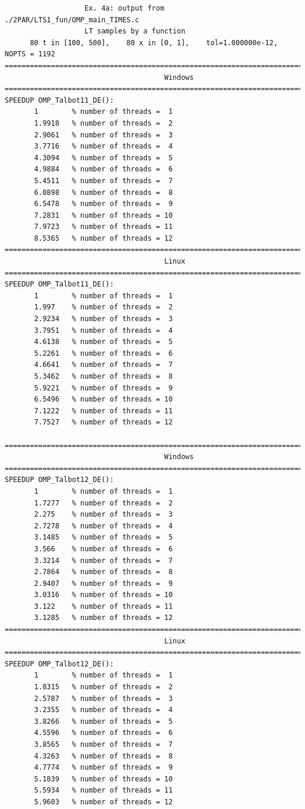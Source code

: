 \documentclass[a4paper,10pt]{report}%
\begin{document}
\begin{lstlisting}
                   Ex. 4a: output from ./2PAR/LTS1_fun/OMP_main_TIMES.c
                   LT samples by a function
      80 t in [100, 500],    80 x in [0, 1],    tol=1.000000e-12,    NOPTS = 1192
====================================================================================
                                      Windows
====================================================================================
SPEEDUP OMP_Talbot11_DE():
       1        % number of threads =  1
       1.9918   % number of threads =  2
       2.9061   % number of threads =  3
       3.7716   % number of threads =  4
       4.3094   % number of threads =  5
       4.9884   % number of threads =  6
       5.4511   % number of threads =  7
       6.0898   % number of threads =  8
       6.5478   % number of threads =  9
       7.2831   % number of threads = 10
       7.9723   % number of threads = 11
       8.5365   % number of threads = 12
====================================================================================
                                      Linux
====================================================================================
SPEEDUP OMP_Talbot11_DE():
       1        % number of threads =  1
       1.997    % number of threads =  2
       2.9234   % number of threads =  3
       3.7951   % number of threads =  4
       4.6138   % number of threads =  5
       5.2261   % number of threads =  6
       4.6641   % number of threads =  7
       5.3462   % number of threads =  8
       5.9221   % number of threads =  9
       6.5496   % number of threads = 10
       7.1222   % number of threads = 11
       7.7527   % number of threads = 12

====================================================================================
                                      Windows
====================================================================================
SPEEDUP OMP_Talbot12_DE():
       1        % number of threads =  1
       1.7277   % number of threads =  2
       2.275    % number of threads =  3
       2.7278   % number of threads =  4
       3.1485   % number of threads =  5
       3.566    % number of threads =  6
       3.3214   % number of threads =  7
       2.7864   % number of threads =  8
       2.9407   % number of threads =  9
       3.0316   % number of threads = 10
       3.122    % number of threads = 11
       3.1285   % number of threads = 12
====================================================================================
                                      Linux
====================================================================================
SPEEDUP OMP_Talbot12_DE():
       1        % number of threads =  1
       1.8315   % number of threads =  2
       2.5787   % number of threads =  3
       3.2355   % number of threads =  4
       3.8266   % number of threads =  5
       4.5596   % number of threads =  6
       3.8565   % number of threads =  7
       4.3263   % number of threads =  8
       4.7774   % number of threads =  9
       5.1839   % number of threads = 10
       5.5934   % number of threads = 11
       5.9603   % number of threads = 12


\end{lstlisting}
\end{document}

